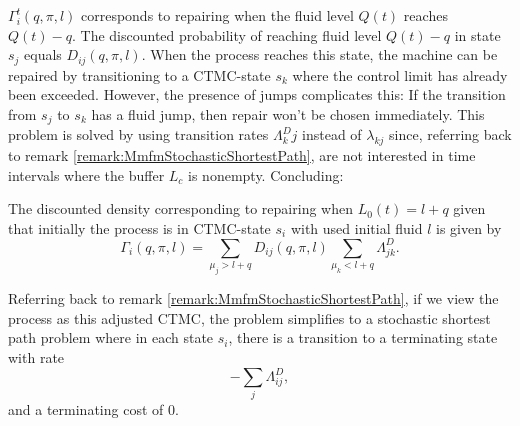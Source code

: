 $\Gamma_i^t(q,\pi,l)$ corresponds to repairing when the fluid level $Q(t)$ reaches $Q(t)-q$.
The discounted probability of reaching fluid level $Q(t)-q$ in state $s_j$ equals $D_{ij}(q, \pi,l)$.
When the process reaches this state, the machine can be repaired by transitioning to a CTMC-state $s_k$ where the control limit has already been exceeded.
However, the presence of jumps complicates this:
If the transition from $s_j$ to $s_k$ has a fluid jump, then repair won't be chosen immediately.
This problem is solved by using transition rates $\Lambda^D_kj$ instead of $\lambda_{kj}$ since, referring back to remark \ref{remark:MmfmStochasticShortestPath}, are not interested in time intervals where the buffer $L_c$ is nonempty.
Concluding:

\begin{theorem}
	The discounted density corresponding to repairing when $L_0(t)=l+q$ given that initially the process is in CTMC-state $s_i$ with used initial fluid $l$ is given by
	\[
	\Gamma_i(q,\pi,l)=\sum\limits_{\mu_j>l+q}D_{ij}(q,\pi,l)\sum\limits_{\mu_k<l+q}\Lambda_{jk}^D.
	\]
\end{theorem}


\begin{remark}
	Referring back to remark \ref{remark:MmfmStochasticShortestPath}, if we view the process as this adjusted CTMC, the problem simplifies to a stochastic shortest path problem where in each state $s_i$, there is a transition to a terminating state with rate
	\[
	-\sum\limits_j \Lambda^D_{ij},
	\]
	and a terminating cost of 0.
\end{remark}